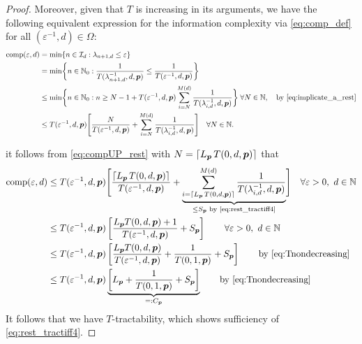 \documentclass[11pt,a4paper]{article}
\renewcommand{\hI}{\ci}
\begin{document}
\begin{proof}
Moreover, given that $T$ is increasing in its arguments, we have the following equivalent expression for the information complexity via \eqref{eq:comp_def} for all $(\varepsilon^{-1},d) \in \Omega$:
\begin{align} %
	\nonumber
	\comp(\varepsilon, d) & = \min \{n \in \hI_d : \lambda_{n+1, d} \le \varepsilon\} \\
	\nonumber
	& = \min \biggl\{n \in \natzero : \frac{1}{T(\lambda_{n+1,d}^{-1},d,\vp)}\le \frac{1}{T(\varepsilon^{-1},d,\vp) }\biggr\}\\
	\nonumber
	& \le  \min \biggl\{n \in \natzero : n \ge N - 1 + T(\varepsilon^{-1},d,\vp) \sum_{i=N}^{M(d)} \frac{1}{T(\lambda_{i, d}^{-1},d,\vp)} \biggr\} \;  \forall N \in \naturals, \quad \text{by \eqref{eq:implicate_a_rest}} \\ 
	& \le  T(\varepsilon^{-1},d,\vp) \Biggl [\frac{N}{T(\varepsilon^{-1},d,\vp)}  +  \sum_{i=N}^{M(d)} \frac{1}{T(\lambda_{i, d}^{-1},d,\vp)} \Biggr] \quad \forall N \in \naturals. \label{eq:compUP_rest}
\end{align}

it follows from \eqref{eq:compUP_rest} with $N = \lceil L_{\boldsymbol{p}}\, T(0,d,\boldsymbol{p})\rceil$ that 
\begin{align*}
       \operatorname{comp}(\varepsilon,d)
       & \le T(\varepsilon^{-1},d,\boldsymbol{p}) \Biggl [ 
       \frac{\lceil L_{\boldsymbol{p}}\, T(0,d,\boldsymbol{p})\rceil}{T(\varepsilon^{-1},d,\boldsymbol{p})}  + 
       \underbrace{\sum_{i=\lceil L_{\boldsymbol{p}}\, T(0,d,\boldsymbol{p})\rceil}^{M(d)} \frac{1}{T(\lambda_{i, d}^{-1},d,\boldsymbol{p})}}_{\le S_{\boldsymbol{p}} \text{ by \eqref{eq:rest_tractiff4}}}
       \Biggr ] 
        \quad \forall \varepsilon > 0, \ d  \in \mathbb{N}\\
       & \le T(\varepsilon^{-1},d,\boldsymbol{p})\left[\frac{L_{\boldsymbol{p}} T(0,d,\boldsymbol{p})+1}{T(\varepsilon^{-1},d, \boldsymbol{p})} +  S_{\boldsymbol{p}} \right]
        \qquad \forall \varepsilon > 0, \ d  \in \mathbb{N}\\
       & \le T(\varepsilon^{-1},d,\boldsymbol{p})\left[\frac{L_{\boldsymbol{p}} T(0,d,\boldsymbol{p})}{T(\varepsilon^{-1},d, \boldsymbol{p})}
       + \frac{1}{T(0,1, \boldsymbol{p})} + S_{\boldsymbol{p}}\right]
       \qquad \text{by \eqref{eq:Tnondecreasing}}   \\
       & \le T(\varepsilon^{-1},d,\boldsymbol{p}) 
       \underbrace{\left [  L_{\boldsymbol{p}} + \frac{1}{T(0,1, \boldsymbol{p})} + S_{\boldsymbol{p}} \right]}_{=:C_{\boldsymbol{p}}}
       \qquad \text{by \eqref{eq:Tnondecreasing}}  
\end{align*}
It follows that we have $T$-tractability, which shows sufficiency of \eqref{eq:rest_tractiff4}.

\bigskip


\end{proof}
\end{document}
